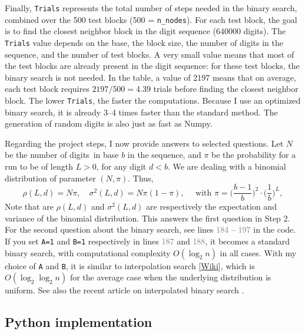 \documentclass[oneside,10pt]{book}
\begin{document}
Finally, \texttt{Trials} represents the total number of steps needed in the binary search, combined over the 
500 test blocks (500 = \texttt{n\_nodes}). For each test block, the goal is to find the closest neighbor block in the  digit sequence
 ($\num{640000}$ digits). The \texttt{Trials} value depends on the base, the block size, the number of digits in the sequence, and the number of test blocks.
A very small value means that most of the test blocks are already present in the digit sequence: for these test blocks,  the binary search is not needed. 
In the table, a value of 2197 means that on average, each test block requires $2197 / 500 = 4.39$ trials before finding the closest neighbor block.
 The lower \texttt{Trials}, the faster the computations. Because I use an optimized binary search, it is already 3--4 times faster than the standard method.
The generation of random digits is also just as fast as Numpy.
 
Regarding the project steps, I now provide answers to selected questions. Let $N$ be the number of digits~in base $b$ in the sequence, and $\pi$ be the probability for a run to be of length $L > 0$, for any digit $d<b$. We  are dealing with  a \textcolor{index}{binomial distribution} of parameter $(N, \pi)$. Thus, 
$$
\rho(L,d) = N \pi, \quad \sigma^2(L, d) = N\pi(1-\pi), \quad \text{ with } \pi = \Big(\frac{b-1}{b}\Big)^2 \cdot \Big(\frac{1}{b}\Big)^L,
$$
Note that  are $\rho(L,d)$ and $\sigma^2(L, d)$ are respectively the expectation 
 and variance of the binomial distribution.  This answers the first question in \textcolor{index}{Step 2}. For the second question about the binary search,
 see lines \textcolor{gray}{184} -- \textcolor{gray}{197} in the code. If you set \texttt{A=1} and \texttt{B=1} respectively
 in lines  \textcolor{gray}{187} and \textcolor{gray}{188}, it becomes a standard binary search, with 
\textcolor{index}{computational complexity} $O(\log_2 n)$ in all cases. With my choice of \texttt{A} and \texttt{B}, 
 it is similar to \textcolor{index}{interpolation search} [\href{https://en.wikipedia.org/wiki/Interpolation_search}{Wiki}], which is $O(\log_2 \log_2 n)$ for the average case when the underlying distribution is uniform. See also the recent article 
on \textcolor{index}{interpolated binary search} \cite{charleroi}.



\subsection{Python implementation}\label{codesda}
\end{document}
